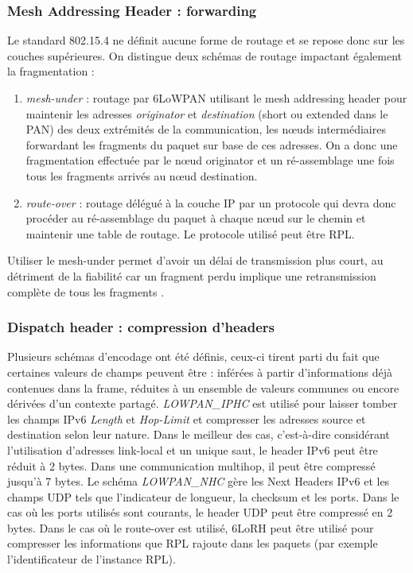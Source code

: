 \documentclass[]{report}
\begin{document}
\subsubsection{Mesh Addressing Header : forwarding}

\par Le standard 802.15.4 ne définit aucune forme de routage et se repose donc sur les couches supérieures. On distingue deux schémas de routage impactant également la fragmentation :
\begin{enumerate}
\item \textit{mesh-under} : routage par 6LoWPAN utilisant le mesh addressing header pour maintenir les adresses \textit{originator} et \textit{destination} (short ou extended dans le PAN) des deux extrémités de la communication, les nœuds intermédiaires forwardant les fragments du paquet sur base de ces adresses. On a donc une fragmentation effectuée par le nœud originator et un ré-assemblage une fois tous les fragments arrivés au nœud destination.
\vspace{0.1cm}
\item \textit{route-over} : routage délégué à la couche IP par un protocole qui devra donc procéder au ré-assemblage du paquet à chaque nœud sur le chemin et maintenir une table de routage. Le protocole utilisé peut être RPL.
\end{enumerate}

\vspace{0.1cm}

Utiliser le mesh-under permet d'avoir un délai de transmission plus court, au détriment de la fiabilité car un fragment perdu implique une retransmission complète de tous les fragments \cite{wiki:6LoWPAN}.

\subsubsection{Dispatch header : compression d'headers}

\par Plusieurs schémas d'encodage ont été définis, ceux-ci tirent parti du fait que certaines valeurs de champs peuvent être : inférées à partir d'informations déjà contenues dans la frame, réduites à un ensemble de valeurs communes ou encore dérivées d'un contexte partagé. \textit{LOWPAN\_IPHC} est utilisé pour laisser tomber les champs IPv6 \textit{Length} et \textit{Hop-Limit} et compresser les adresses source et destination selon leur nature. Dans le meilleur des cas, c'est-à-dire considérant l'utilisation d'adresses link-local et un unique saut, le header IPv6 peut être réduit à 2 bytes. Dans une communication multihop, il peut être compressé jusqu'à 7 bytes. Le schéma \textit{LOWPAN\_NHC} gère les Next Headers IPv6 et les champs UDP tels que l'indicateur de longueur, la checksum et les ports. Dans le cas où les ports utilisés sont courants, le header UDP peut être compressé en 2 bytes. Dans le cas où le route-over est utilisé, 6LoRH \cite{rfc8138} peut être utilisé pour compresser les informations que RPL rajoute dans les paquets (par exemple l'identificateur de l'instance RPL). 
\end{document}
